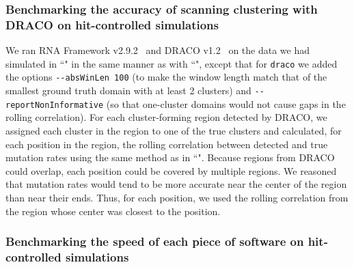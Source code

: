 \documentclass[unnumsec,webpdf,contemporary,large]{oup-authoring-template}%
\theoremstyle{thmstyleone}%
\theoremstyle{thmstyletwo}%
\theoremstyle{thmstylethree}%
\begin{document}
\subsubsection{Benchmarking the accuracy of scanning clustering with DRACO on hit-controlled simulations}
\label{benchmark-clusterscan-draco}

We ran RNA Framework v2.9.2~\cite{Incarnato2018} and DRACO v1.2~\cite{Morandi2021} on the data we had simulated in ``" in the same manner as with ``", except that for \verb|draco| we added the options \verb|--absWinLen 100| (to make the window length match that of the smallest ground truth domain with at least 2 clusters) and \verb|--reportNonInformative| (so that one-cluster domains would not cause gaps in the rolling correlation).
For each cluster-forming region detected by DRACO, we assigned each cluster in the region to one of the true clusters and calculated, for each position in the region, the rolling correlation between detected and true mutation rates using the same method as in ``".
Because regions from DRACO could overlap, each position could be covered by multiple regions.
We reasoned that mutation rates would tend to be more accurate near the center of the region than near their ends.
Thus, for each position, we used the rolling correlation from the region whose center was closest to the position.

\subsubsection{Benchmarking the speed of each piece of software on hit-controlled simulations}
\end{document}
